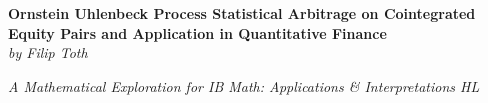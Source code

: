 \documentclass{article}
\begin{document}
\begin{titlepage}
    \vspace*{\fill}
    \vspace*{-4cm}
    \begin{center}
        \huge \textbf { Ornstein Uhlenbeck Process Statistical Arbitrage on Cointegrated Equity Pairs and Application in Quantitative Finance } \\
        \vspace{0.5cm}
        \Large \textit { by Filip Toth }
    \end{center}
    \vspace*{\fill}
    \begin{center}
        \large \textit {A Mathematical Exploration for IB Math: Applications \& Interpretations HL}
    \end{center}
\end{titlepage}

\tableofcontents
\newpage
\end{document}
